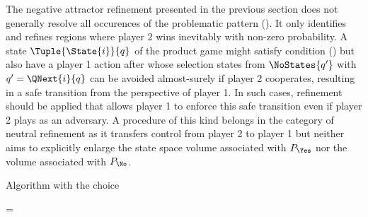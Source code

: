 \startsubsection[title={Safety},reference=sec:refinement-holistic-safety]


    The negative attractor refinement presented in the previous section does not generally resolve all occurences of the problematic pattern ().
    It only identifies and refines regions where player 2 wins inevitably with non-zero probability.
    A state $\Tuple{\State{i}}{q}$ of the product game might satisfy condition () but also have a player 1 action after whose selection states from $\NoStates{q'}$ with $q' = \QNext{i}{q}$ can be avoided almost-surely if player 2 cooperates, resulting in a safe transition from the perspective of player 1.
    In such cases, refinement should be applied that allows player 1 to enforce this safe transition even if player 2 plays as an adversary.
    A procedure of this kind belongs in the category of neutral refinement as it transfers control from player 2 to player 1 but neither aims to explicitly enlarge the state space volume associated with $P_\Yes$ nor the volume associated with $P_\No$.

    Algorithm  with the choice

    \startformula
         = 
    \stopformula

